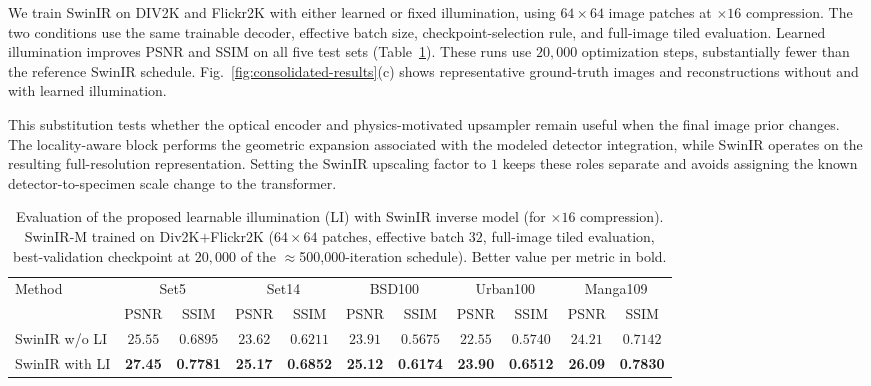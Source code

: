 \documentclass{optica-article}
\begin{document}
We train SwinIR on DIV2K and Flickr2K with either learned or fixed illumination, using $64\times64$ image patches at $\times16$ compression. The two conditions use the same trainable decoder, effective batch size, checkpoint-selection rule, and full-image tiled evaluation. Learned illumination improves PSNR and SSIM on all five test sets (Table~\ref{tab:swinir-results}). These runs use $20{,}000$ optimization steps, substantially fewer than the reference SwinIR schedule. Fig.~\ref{fig:consolidated-results}(c) shows representative ground-truth images and reconstructions without and with learned illumination.

This substitution tests whether the optical encoder and physics-motivated upsampler remain useful when the final image prior changes. The locality-aware block performs the geometric expansion associated with the modeled detector integration, while SwinIR operates on the resulting full-resolution representation. Setting the SwinIR upscaling factor to $1$ keeps these roles separate and avoids assigning the known detector-to-specimen scale change to the transformer.

\begin{table}[t]
    \centering
    \caption{
    Evaluation of the proposed learnable illumination (LI) with SwinIR inverse model (for $\times 16$ compression).
    SwinIR-M trained on Div2K$+$Flickr2K ($64\times64$ patches, effective batch $32$, full-image tiled evaluation, best-validation checkpoint at $20{,}000$ of the $\approx$500{,}000-iteration schedule).
    Better value per metric in bold.
    }
    \label{tab:swinir-results}
    \footnotesize
    \setlength{\tabcolsep}{3pt}
    \begin{tabular}{lcccccccccc}
        \hline
        Method & \multicolumn{2}{c}{Set5} & \multicolumn{2}{c}{Set14} & \multicolumn{2}{c}{BSD100} & \multicolumn{2}{c}{Urban100} & \multicolumn{2}{c}{Manga109} \\
        & PSNR & SSIM & PSNR & SSIM & PSNR & SSIM & PSNR & SSIM & PSNR & SSIM \\
        \hline
        SwinIR w/o LI
        & $25.55$ & $0.6895$
        & $23.62$ & $0.6211$
        & $23.91$ & $0.5675$
        & $22.55$ & $0.5740$
        & $24.21$ & $0.7142$ \\

        SwinIR with LI
        & \textbf{27.45} & \textbf{0.7781}
        & \textbf{25.17} & \textbf{0.6852}
        & \textbf{25.12} & \textbf{0.6174}
        & \textbf{23.90} & \textbf{0.6512}
        & \textbf{26.09} & \textbf{0.7830} \\
        \hline
    \end{tabular}
\end{table}
\end{document}
